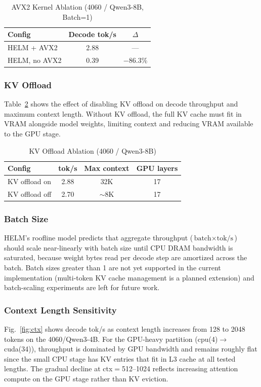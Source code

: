 \documentclass[lettersize,journal]{IEEEtran}
\begin{document}
\begin{table}[!t]
\caption{AVX2 Kernel Ablation (4060 / Qwen3-8B, Batch=1)}
\label{tab:ablation_avx}
\centering
\small
\begin{tabular}{lcc}
\toprule
\textbf{Config} & \textbf{Decode tok/s} & \textbf{$\Delta$} \\
\midrule
HELM + AVX2      & 2.88 & --- \\
HELM, no AVX2    & 0.39 & $-$86.3\% \\
\bottomrule
\end{tabular}
\end{table}

\subsubsection{KV Offload}
Table~\ref{tab:ablation_kv} shows the effect of disabling KV offload on
decode throughput and maximum context length. Without KV offload, the full
KV cache must fit in VRAM alongside model weights, limiting context and
reducing VRAM available to the GPU stage.

\begin{table}[!t]
\caption{KV Offload Ablation (4060 / Qwen3-8B)}
\label{tab:ablation_kv}
\centering
\small
\begin{tabular}{lccc}
\toprule
\textbf{Config} & \textbf{tok/s} & \textbf{Max context} & \textbf{GPU layers} \\
\midrule
KV offload on  & 2.88 & 32K & 17 \\
KV offload off & 2.70 & $\sim$8K & 17 \\
\bottomrule
\end{tabular}
\end{table}

\subsubsection{Batch Size}
HELM's roofline model predicts that aggregate throughput ($\text{batch} \times \text{tok/s}$)
should scale near-linearly with batch size until CPU DRAM bandwidth is saturated,
because weight bytes read per decode step are amortized across the batch.
Batch sizes greater than 1 are not yet supported in the current implementation
(multi-token KV cache management is a planned extension) and batch-scaling
experiments are left for future work.

\subsubsection{Context Length Sensitivity}
Fig.~\ref{fig:ctx} shows decode tok/s as context length increases from 128
to 2048 tokens on the 4060/Qwen3-4B. For the GPU-heavy partition
(cpu(4)$\to$cuda(34)), throughput is dominated by GPU bandwidth and
remains roughly flat since the small CPU stage has KV entries that fit
in L3 cache at all tested lengths. The gradual decline at ctx$=$512--1024
reflects increasing attention compute on the GPU stage rather than KV eviction.
\end{document}
